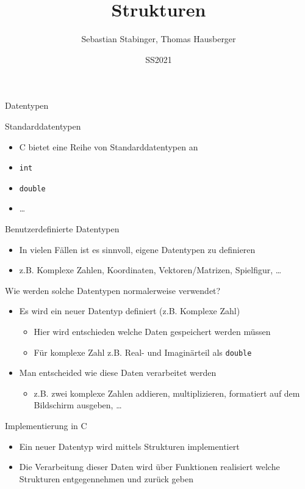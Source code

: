 \documentclass[presentation]{beamer}
\author{Sebastian Stabinger, Thomas Hausberger}
\date{SS2021}
\title{Strukturen}
\begin{document}
\maketitle
\begin{frame}[label={sec:org4a19e47},fragile]{Datentypen}
 \begin{block}{Standarddatentypen}
\begin{itemize}
\item C bietet eine Reihe von Standarddatentypen an
\item {\color{solarizedYellow}\texttt{int}}
\item {\color{solarizedYellow}\texttt{double}}
\item \ldots{}
\end{itemize}
\end{block}
\begin{block}{Benutzerdefinierte Datentypen}
\begin{itemize}
\item In vielen Fällen ist es sinnvoll, \alert{eigene Datentypen} zu definieren
\item z.B. Komplexe Zahlen, Koordinaten, Vektoren/Matrizen, Spielfigur, \ldots{}
\end{itemize}
\end{block}
\end{frame}
\begin{frame}[label={sec:org9b59a7a},fragile]{Wie werden solche Datentypen normalerweise verwendet?}
 \begin{itemize}
\item Es wird ein \alert{neuer Datentyp} definiert (z.B. Komplexe Zahl)
\begin{itemize}
\item Hier wird entschieden welche Daten gespeichert werden müssen
\item Für komplexe Zahl z.B. \alert{Real- und Imaginärteil} als {\color{solarizedYellow}\texttt{double}}
\end{itemize}
\item Man entscheided wie diese \alert{Daten verarbeitet} werden
\begin{itemize}
\item z.B. zwei komplexe Zahlen addieren, multiplizieren, formatiert
auf dem Bildschirm ausgeben, \ldots{}
\end{itemize}
\end{itemize}
\begin{block}{Implementierung in C}
\begin{itemize}
\item Ein \alert{neuer Datentyp} wird mittels \alert{Strukturen} implementiert
\item Die \alert{Verarbeitung} dieser Daten wird über \alert{Funktionen} realisiert
welche Strukturen entgegennehmen und zurück geben
\end{itemize}
\end{block}
\end{frame}
\end{document}
